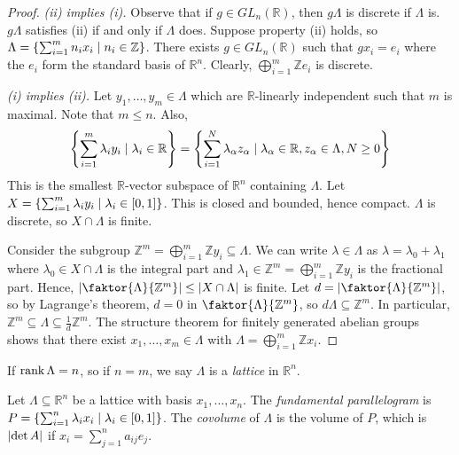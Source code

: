 \begin{proof}
    \emph{(ii) implies (i).}
    Observe that if \( g \in GL_n(\mathbb R) \), then \( g\Lambda \) is discrete if \( \Lambda \) is.
    \( g\Lambda \) satisfies (ii) if and only if \( \Lambda \) does.
    Suppose property (ii) holds, so \( \Lambda = \qty{\sum_{i=1}^m n_i x_i \mid n_i \in \mathbb Z} \).
    There exists \( g \in GL_n(\mathbb R) \) such that \( gx_i = e_i \) where the \( e_i \) form the standard basis of \( \mathbb R^n \).
    Clearly, \( \bigoplus_{i=1}^m \mathbb Z e_i \) is discrete.

    \emph{(i) implies (ii).}
    Let \( y_1, \dots, y_m \in \Lambda \) which are \( \mathbb R \)-linearly independent such that \( m \) is maximal.
    Note that \( m \leq n \).
    Also,
    \[ \qty{\sum_{i=1}^m \lambda_i y_i \mid \lambda_i \in \mathbb R} = \qty{\sum_{i=1}^N \lambda_\alpha z_\alpha \mid \lambda_\alpha \in \mathbb R, z_\alpha \in \Lambda, N \geq 0} \]
    This is the smallest \( \mathbb R \)-vector subspace of \( \mathbb R^n \) containing \( \Lambda \).
    Let \( X = \qty{\sum_{i=1}^m \lambda_i y_i \mid \lambda_i \in [0,1]} \).
    This is closed and bounded, hence compact.
    \( \Lambda \) is discrete, so \( X \cap \Lambda \) is finite.

    Consider the subgroup \( \mathbb Z^m = \bigoplus_{i=1}^m \mathbb Z y_i \subseteq \Lambda \).
    We can write \( \lambda \in \Lambda \) as \( \lambda = \lambda_0 + \lambda_1 \) where \( \lambda_0 \in X \cap \Lambda \) is the integral part and \( \lambda_1 \in \mathbb Z^m = \bigoplus_{i=1}^m \mathbb Z y_i \) is the fractional part.
    Hence, \( \abs{\faktor{\Lambda}{\mathbb Z^m}} \leq \abs{X \cap \Lambda} \) is finite.
    Let \( d = \abs{\faktor{\Lambda}{\mathbb Z^m}} \), so by Lagrange's theorem, \( d = 0 \) in \( \faktor{\Lambda}{\mathbb Z^m} \), so \( d\Lambda \subseteq \mathbb Z^m \).
    In particular, \( \mathbb Z^m \subseteq \Lambda \subseteq \frac{1}{d} \mathbb Z^m \).
    The structure theorem for finitely generated abelian groups shows that there exist \( x_1, \dots, x_m \in \Lambda \) with \( \Lambda = \bigoplus_{i=1}^m \mathbb Z x_i \).
\end{proof}
\begin{definition}
    If \( \rank \Lambda = n \), so if \( n = m \), we say \( \Lambda \) is a \emph{lattice} in \( \mathbb R^n \).
\end{definition}
\begin{definition}
    Let \( \Lambda \subseteq \mathbb R^n \) be a lattice with basis \( x_1, \dots, x_n \).
    The \emph{fundamental parallelogram} is \( P = \qty{\sum_{i=1}^n \lambda_i x_i \mid \lambda_i \in [0,1]} \).
    The \emph{covolume} of \( \Lambda \) is the volume of \( P \), which is \( \abs{\det A} \) if \( x_i = \sum_{j=1}^n a_{ij} e_j \).
\end{definition}
